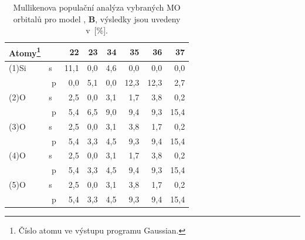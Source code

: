 \documentclass[
digital, %
table,   %
nolof,     %
nolot,     %
oneside,
]{fithesis3}
\begin{document}
\begin{table}[H] \begin{minipage}{\textwidth}
\caption{Mullikenova populační analýza vybraných MO orbitalů pro model , \textbf{B}, výsledky jsou uvedeny v~[\%].}
\begin{center}
\begin{tabular}{|l|r|r|r|r|r|r|r|}
\hline
Atomy\footnote{Číslo atomu ve výstupu programu Gaussian.}\label{si_och3_4_MPA} &  & 22 & 23 & 34 & 35 & 36 & 37 \\ \hline
(1)Si & s~& 11,1  & 0,0  & 4,6  & 0,0  & 0,0  & 0,0  \\ \hline
& p & 0,0  & 5,1  & 0,0  & 12,3  & 12,3  & 2,7  \\ \hline
(2)O& s~& 2,5  & 0,0  & 3,1  & 1,7  & 3,8  & 0,2  \\ \hline
& p & 5,4  & 6,5  & 9,0  & 9,4  & 9,3  & 15,4  \\ \hline
(3)O & s~& 2,5  & 0,0  & 3,1  & 3,8  & 1,7  & 0,2  \\ \hline
& p & 5,4  & 3,3  & 4,5  & 9,3  & 9,4  & 15,4  \\ \hline
(4)O & s~& 2,5  & 0,0  & 3,1  & 1,7  & 3,8  & 0,2  \\ \hline
& p & 5,4  & 3,3  & 4,5  & 9,4  & 9,3  & 15,4  \\ \hline
(5)O & s~& 2,5  & 0,0  & 3,1  & 3,8  & 1,7  & 0,2  \\ \hline
& p & 5,4  & 3,3  & 4,5  & 9,3  & 9,4  & 15,4  \\ \hline
\end{tabular}
\end{center}
\end{minipage}
\end{table}
\end{document}
